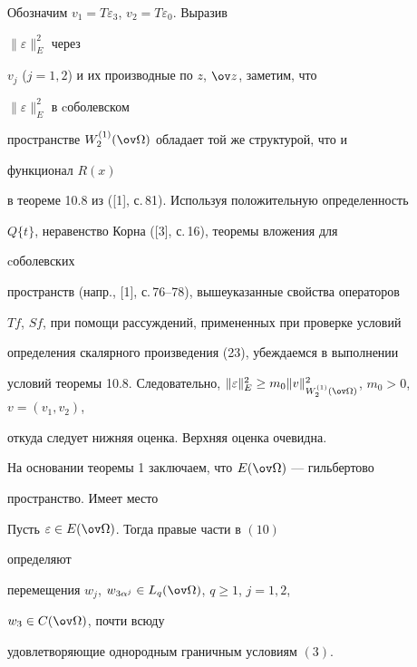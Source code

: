  


\begin{pf} 


Обозначим $v_1=T\varepsilon_3$, $v_2=T\varepsilon_0$. Выразив 


$\|\varepsilon\|^2_E$ через 


$v_j$ ($j=1,2$) и их производные по $z$, $\ov z$, заметим, что 


$\|\varepsilon\|^2_E$ в cоболевском 


пространстве $W^{(1)}_2(\ov\Omega)$ обладает той же структурой, что и 


функционал $R(x)$ 


в теореме 10.8 из ([1], с.\,81). Используя положительную определенность 


$Q\{t\}$, неравенство Корна ([3], с.\,16), теоремы вложения для 


cоболевских 


пространств (напр., [1], с.\,76--78), вышеуказанные свойства операторов 


$Tf$, $Sf$, при помощи рассуждений, примененных при проверке условий 


определения скалярного произведения (23), убеждаемся в выполнении 


условий теоремы 10.8. Следовательно, $\|\varepsilon\|^2_E\ge 


m_0\|v\|^2_{W^{(1)}_2(\ov\Omega)}$, $m_0>0$, $v=(v_1,v_2)$, 


откуда следует нижняя оценка. Верхняя оценка очевидна. 


\end{pf} 





 


На основании теоремы 1 заключаем, что $E(\ov\Omega)$ --- гильбертово 


пространство. Имеет место 





 


\begin{lem} 


Пусть $\varepsilon\in E(\ov\Omega)$. Тогда правые части в $(10)$ 


определяют 


перемещения $w_j$, $w_{3\alpha^j}\in L_q(\ov\Omega)$, $q\ge1$, $j=1,2$, 


$w_3\in C(\ov\Omega)$, почти всюду 


удовлетворяющие однородным граничным условиям $(3)$. 


\end{lem} 





